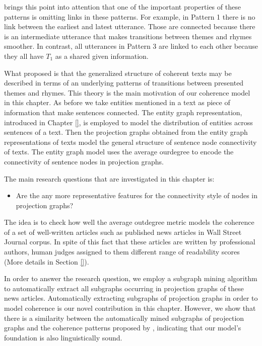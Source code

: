  brings this point into attention that one of the important properties of these patterns is omitting links in these patterns.  
For example, in Pattern 1 there is no link between the earliest and latest utterance. 
Those are connected because there is an intermediate utterance that makes transitions between themes and rhymes smoother. 
In contrast, all utterances in Pattern 3  are linked to each other because they all have $T_1$ as a shared given information. 

What  proposed is that the generalized structure of coherent texts may be described in terms of an underlying patterns of transitions between presented themes and rhymes.
This theory is the main motivation of our coherence model in this chapter. 
As before we take entities mentioned in a text as piece of information that make sentences connected. 
The entity graph representation, introduced in Chapter \ref{}, is employed to model the distribution of entities across sentences of a text. 
Then the projection graphs obtained from the entity graph representations of texts model the general structure of sentence node connectivity of texts. 
The entity graph model uses the average ourdegree to encode the connectivity of sentence nodes in projection graphs. 

The main research questions that are investigated in this chapter is:

\begin{itemize}
\item Are the any more representative features for the connectivity style of nodes in projection graphs?
\end{itemize}

The idea is to check how well the average outdegree metric models the coherence of a set of well-written articles such as published news articles in Wall Street Journal corpus.  
In spite of this fact that these articles are written by professional authors, human judges assigned to them different range of readability scores (More details in Section \ref{}).  

In order to answer the research question, we employ a subgraph mining algorithm to automatically extract all  subgraphs occurring in projection graphs of these news articles. 
Automatically extracting subgraphs of projection graphs in order to model coherence is our novel contribution in this chapter. 
However, we show that there is a similarity between the automatically mined subgraphs of projection graphs and the coherence patterns proposed by , indicating that our model's foundation is also linguistically sound.  


